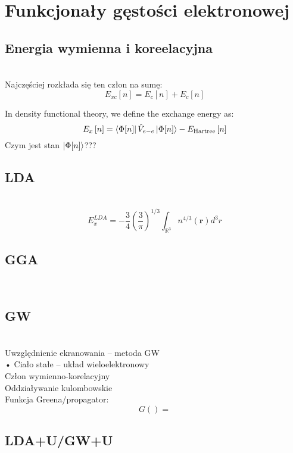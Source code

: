 \section{Funkcjonały gęstości elektronowej}


\subsection{Energia wymienna i koreelacyjna}
~\\
Najczęściej rozkłada się ten człon na sumę:
$$ E_{xc}\left[n\right] = E_{c}\left[n\right] + E_{c}\left[n\right] $$

In density functional theory, we define the exchange energy as:
$$ E_x \left[n\right] = \bra{\Phi[n]} \hat{V}_{e-e} \ket{\Phi[n]} - E_{\text{Hartree}} \left[n\right]$$ 
Czym jest stan $\ket{\Phi[n]}$???


\subsection{LDA}
~\\

\begin{equation}
E_x^{LDA} = -\frac{3}{4}\left(\frac{3}{\pi}\right)^{1/3}\int_{\mathbb{R}^3} n^{4/3}\left(\boldsymbol{r}\right) d^3r
\end{equation}


\subsection{GGA}
~\\


\subsection{GW}
~\\
Uwzględnienie ekranowania – metoda GW\\
• Ciało stałe – układ wieloelektronowy\\
Człon wymienno-korelacyjny\\
Oddziaływanie kulombowskie\\
Funkcja Greena/propagator:\\

$$ G() = $$

\subsection{LDA+U/GW+U}
~\\


